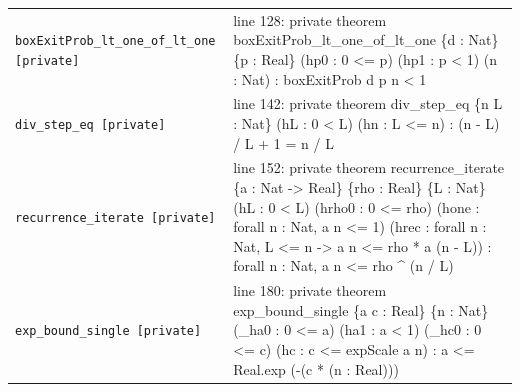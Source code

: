 \documentclass[10pt]{article}
\begin{document}
\begin{longtable}{>{\raggedright\arraybackslash}p{} >{\raggedright\arraybackslash}p{}}
\texttt{boxExitProb\_\allowbreak{}lt\_\allowbreak{}one\_\allowbreak{}of\_\allowbreak{}lt\_\allowbreak{}one [private]} & {\ttfamily\scriptsize line 128:\allowbreak{} private theorem boxExitProb\_\allowbreak{}lt\_\allowbreak{}one\_\allowbreak{}of\_\allowbreak{}lt\_\allowbreak{}one \{d :\allowbreak{} Nat\} \{p :\allowbreak{} Real\} (\allowbreak{}hp0 :\allowbreak{} 0 <=\allowbreak{} p)\allowbreak{} (\allowbreak{}hp1 :\allowbreak{} p < 1)\allowbreak{} (\allowbreak{}n :\allowbreak{} Nat)\allowbreak{} :\allowbreak{} boxExitProb d p n < 1} \\[0.45em]
\texttt{div\_\allowbreak{}step\_\allowbreak{}eq [private]} & {\ttfamily\scriptsize line 142:\allowbreak{} private theorem div\_\allowbreak{}step\_\allowbreak{}eq \{n L :\allowbreak{} Nat\} (\allowbreak{}hL :\allowbreak{} 0 < L)\allowbreak{} (\allowbreak{}hn :\allowbreak{} L <=\allowbreak{} n)\allowbreak{} :\allowbreak{} (\allowbreak{}n -\allowbreak{} L)\allowbreak{} /\allowbreak{} L +\allowbreak{} 1 =\allowbreak{} n /\allowbreak{} L} \\[0.45em]
\texttt{recurrence\_\allowbreak{}iterate [private]} & {\ttfamily\scriptsize line 152:\allowbreak{} private theorem recurrence\_\allowbreak{}iterate \{a :\allowbreak{} Nat -\allowbreak{}> Real\} \{rho :\allowbreak{} Real\} \{L :\allowbreak{} Nat\} (\allowbreak{}hL :\allowbreak{} 0 < L)\allowbreak{} (\allowbreak{}hrho0 :\allowbreak{} 0 <=\allowbreak{} rho)\allowbreak{} (\allowbreak{}hone :\allowbreak{} forall n :\allowbreak{} Nat,\allowbreak{} a n <=\allowbreak{} 1)\allowbreak{} (\allowbreak{}hrec :\allowbreak{} forall n :\allowbreak{} Nat,\allowbreak{} L <=\allowbreak{} n -\allowbreak{}> a n <=\allowbreak{} rho *\allowbreak{} a (\allowbreak{}n -\allowbreak{} L)\allowbreak{})\allowbreak{} :\allowbreak{} forall n :\allowbreak{} Nat,\allowbreak{} a n <=\allowbreak{} rho \textasciicircum{} (\allowbreak{}n /\allowbreak{} L)\allowbreak{}} \\[0.45em]
\texttt{exp\_\allowbreak{}bound\_\allowbreak{}single [private]} & {\ttfamily\scriptsize line 180:\allowbreak{} private theorem exp\_\allowbreak{}bound\_\allowbreak{}single \{a c :\allowbreak{} Real\} \{n :\allowbreak{} Nat\} (\allowbreak{}\_\allowbreak{}ha0 :\allowbreak{} 0 <=\allowbreak{} a)\allowbreak{} (\allowbreak{}ha1 :\allowbreak{} a < 1)\allowbreak{} (\allowbreak{}\_\allowbreak{}hc0 :\allowbreak{} 0 <=\allowbreak{} c)\allowbreak{} (\allowbreak{}hc :\allowbreak{} c <=\allowbreak{} expScale a n)\allowbreak{} :\allowbreak{} a <=\allowbreak{} Real.\allowbreak{}exp (\allowbreak{}-\allowbreak{}(\allowbreak{}c *\allowbreak{} (\allowbreak{}n :\allowbreak{} Real)\allowbreak{})\allowbreak{})\allowbreak{}} \\[0.45em]

\end{longtable}
\end{document}
